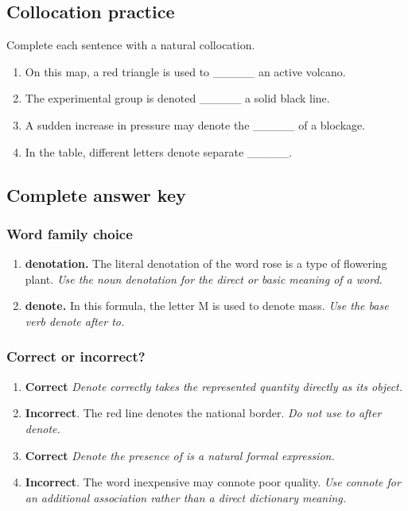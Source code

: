 \documentclass[11pt]{article}
\begin{document}
\subsection{Collocation practice}
Complete each sentence with a natural collocation.

\begin{enumerate}
  \item On this map, a red triangle is used to \_\_\_\_\_ an active volcano.
  \item The experimental group is denoted \_\_\_\_\_ a solid black line.
  \item A sudden increase in pressure may denote the \_\_\_\_\_ of a blockage.
  \item In the table, different letters denote separate \_\_\_\_\_.
\end{enumerate}

\subsection{Complete answer key}
\subsubsection{Word family choice}
\begin{enumerate}
  \item \textbf{denotation.} The literal denotation of the word rose is a type of flowering plant. \emph{Use the noun denotation for the direct or basic meaning of a word.}
  \item \textbf{denote.} In this formula, the letter M is used to denote mass. \emph{Use the base verb denote after to.}
\end{enumerate}

\subsubsection{Correct or incorrect?}
\begin{enumerate}
  \item \textbf{Correct} \emph{Denote correctly takes the represented quantity directly as its object.}
  \item \textbf{Incorrect}. The red line denotes the national border. \emph{Do not use to after denote.}
  \item \textbf{Correct} \emph{Denote the presence of is a natural formal expression.}
  \item \textbf{Incorrect}. The word inexpensive may connote poor quality. \emph{Use connote for an additional association rather than a direct dictionary meaning.}
\end{enumerate}
\end{document}
